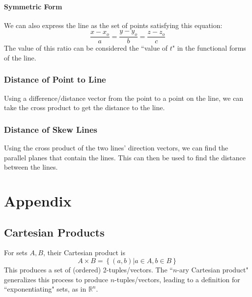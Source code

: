 \documentclass{article}
\begin{document}
\paragraph{Symmetric Form}
We can also express the line as the set of points satisfying this equation:
$$
\frac{x-x_o}{a} = \frac{y-y_o}{b} = \frac{z-z_o}{c}
$$
The value of this ratio can be considered the ``value of $t$" in the functional forms of the line.

\subsubsection{Distance of Point to Line}
Using a difference/distance vector from the point to a point on the line, we can take the cross product to get the distance to the line.

\subsubsection{Distance of Skew Lines}
Using the cross product of the two lines' direction vectors, we can find the parallel planes that contain the lines. This can then be used to find the distance between the lines.

\section{Appendix}
\subsection{Cartesian Products} \label{set-multiplication}
For sets $A, B$, their Cartesian product is $$A \times B = \left\{ (a,b) | a \in A, b \in B\right\}$$
This produces a set of (ordered) 2-tuples/vectors.
The ``$n$-ary Cartesian product" generalizes this process to produce $n$-tuples/vectors, leading to a definition for ``exponentiating" sets, as in $\mathbb{R}^n$.
\end{document}
